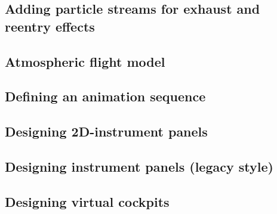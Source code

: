 \documentclass[Orbiter Developer Manual.tex]{subfiles}
\begin{document}
\subsection{Adding particle streams for exhaust and reentry effects}

\subsection{Atmospheric flight model}

\subsection{Defining an animation sequence}

\subsection{Designing 2D-instrument panels}

\subsection{Designing instrument panels (legacy style)}

\subsection{Designing virtual cockpits}
\end{document}
